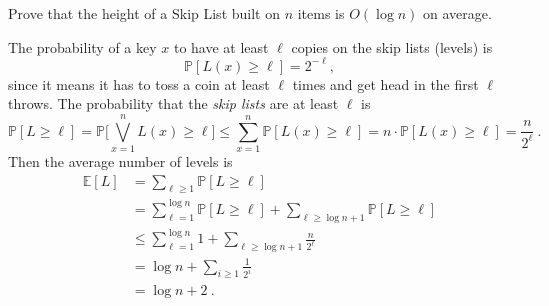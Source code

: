 \exercise

Prove that the height of a Skip List built on $n$ items is $O(\log n)$ on
average.

\solution

The probability of a key $x$ to have at least $\ell$ copies on the skip lists
(levels) is $$\mathbb{P}[L(x) \ge \ell] = 2^{-\ell},$$ since it means it has to
toss a coin at least $\ell$ times and get head in the first $\ell$ throws. The
probability that the \emph{skip lists} are at least $\ell$ is $$\mathbb{P}[L \ge
\ell] = \mathbb{P}\Bigg[\bigvee_{x=1}^n L(x) \ge \ell\Bigg] \le \sum_{x=1}^n
\mathbb{P}[L(x) \ge \ell] = n \cdot \mathbb{P}[L(x) \ge \ell] =
\frac{n}{2^\ell}\ .$$ Then the average number of levels is
%
\begin{align*}
  \mathbb{E}[L] &= \sum_{\ell \ge 1} \mathbb{P}[L \ge \ell] \\
  &= \sum_{\ell = 1}^{\log n} \mathbb{P}[L \ge \ell] + \sum_{\ell \ge \log n + 1} \mathbb{P}[L \ge \ell] \\
  &\le \sum_{\ell = 1}^{\log n} 1 + \sum_{\ell \ge \log n + 1} \frac{n}{2^\ell} \\
  &= \log n + \sum_{i \ge 1} \frac{1}{2^i} \\
  &= \log n + 2\ .
\end{align*}
